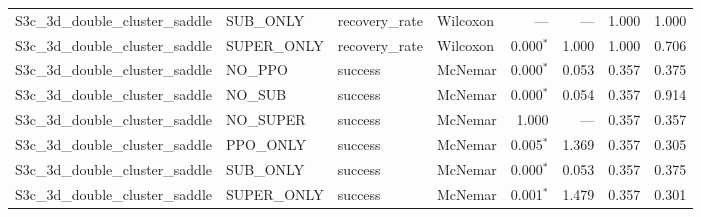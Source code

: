 \begin{tabular}{llllrrrl}
  S3c_3d_double_cluster_saddle & SUB_ONLY & recovery_rate & Wilcoxon & --- & --- & 1.000 & 1.000 \\
  S3c_3d_double_cluster_saddle & SUPER_ONLY & recovery_rate & Wilcoxon & 0.000$^{*}$ & 1.000 & 1.000 & 0.706 \\
  S3c_3d_double_cluster_saddle & NO_PPO & success & McNemar & 0.000$^{*}$ & 0.053 & 0.357 & 0.375 \\
  S3c_3d_double_cluster_saddle & NO_SUB & success & McNemar & 0.000$^{*}$ & 0.054 & 0.357 & 0.914 \\
  S3c_3d_double_cluster_saddle & NO_SUPER & success & McNemar & 1.000 & --- & 0.357 & 0.357 \\
  S3c_3d_double_cluster_saddle & PPO_ONLY & success & McNemar & 0.005$^{*}$ & 1.369 & 0.357 & 0.305 \\
  S3c_3d_double_cluster_saddle & SUB_ONLY & success & McNemar & 0.000$^{*}$ & 0.053 & 0.357 & 0.375 \\
  S3c_3d_double_cluster_saddle & SUPER_ONLY & success & McNemar & 0.001$^{*}$ & 1.479 & 0.357 & 0.301 \\
\bottomrule
\end{tabular}